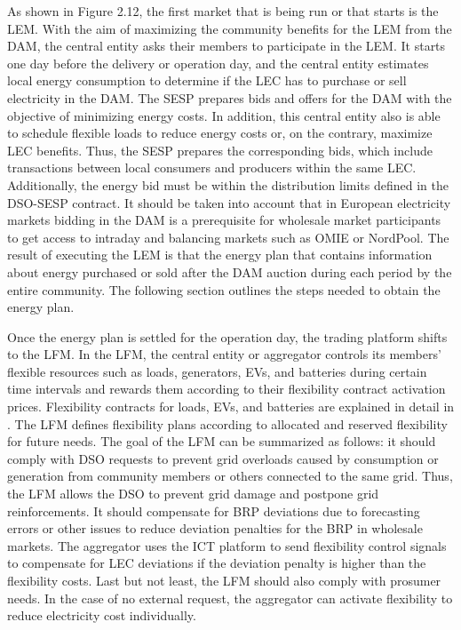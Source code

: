 As shown in Figure 2.12, the first market that is being run or that starts is the LEM. With the aim of maximizing the community benefits for the LEM from the DAM, the central entity asks their members to participate in the LEM. It starts one day before the delivery or operation day, and the central entity estimates local energy consumption to determine if the LEC has to purchase or sell electricity in the DAM. The SESP prepares bids and offers for the DAM with the objective of minimizing energy costs. In addition, this central entity also is able to schedule flexible loads to reduce energy costs or, on the contrary, maximize LEC benefits.
Thus, the SESP prepares the corresponding bids, which include transactions between local consumers and producers within the same LEC.
Additionally, the energy bid must be within the distribution limits defined in the DSO-SESP contract. It should be taken into account that in European electricity markets bidding in the DAM is a prerequisite for wholesale market participants to get access to intraday and balancing markets such as OMIE or NordPool. The result of executing the LEM is that the energy plan that contains information about energy purchased or sold after the DAM auction during each period by the entire community. The following section outlines the steps needed to obtain the energy plan.

Once the energy plan is settled for the operation day, the trading platform shifts to the LFM. In the LFM, the central entity or aggregator controls its members' flexible resources such as loads, generators, EVs, and batteries during certain time intervals and rewards them according to their flexibility contract activation prices. Flexibility contracts for loads, EVs, and batteries are explained in detail in \cite{Olivella2018}. The LFM defines flexibility plans according to allocated and reserved flexibility for future needs. The goal of the LFM can be summarized as follows: it should comply with DSO requests to prevent grid overloads caused by consumption
or generation from community members or others connected to the same grid. Thus, the LFM allows the DSO to prevent grid damage and postpone grid reinforcements. It should compensate for BRP deviations due to forecasting errors or other issues to reduce deviation penalties for the BRP in wholesale markets. The aggregator uses the ICT platform to send flexibility control signals to compensate for LEC deviations if the deviation penalty is higher than the flexibility costs. Last but not least, the LFM should also comply with
prosumer needs. In the case of no external request, the aggregator can activate flexibility to reduce electricity cost individually.

